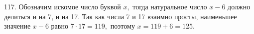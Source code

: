 117. Обозначим искомое число буквой $x,$ тогда натуральное число $x-6$ должно делиться и на 7, и на 17. Так как числа 7 и 17 взаимно просты, наименьшее значение $x-6$ равно $7\cdot17=119,$ поэтому $x=119+6=125.$\\
